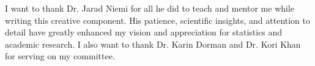 
I want to thank Dr. Jarad Niemi for all he did to teach and mentor me while 
writing this
creative component. His patience, scientific insights, and attention to detail
have greatly enhanced my vision and appreciation for statistics and academic 
research. I 
also want to thank Dr. Karin Dorman and Dr. Kori Khan for serving on my 
committee. 

